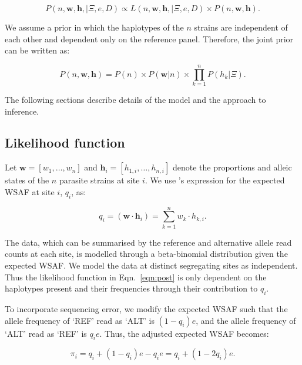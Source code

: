 \documentclass{nature}
\begin{document}
\begin{equation}
P(n, \mathbf{w}, \mathbf{h}, | \Xi, e, D) \propto L(n, \mathbf{w}, \mathbf{h}, | \Xi, e, D) \times P(n, \mathbf{w}, \mathbf{h}). \label{eqn:post}
\end{equation}

\noindent We assume a prior in which the haplotypes of the $n$ strains are independent of each other and dependent only on the reference panel.  Therefore, the joint prior can be written as:

\begin{equation}
P(n, \mathbf{w}, \mathbf{h}) = P(n) \times P(\mathbf{w} | n) \times \prod_{k=1}^{n} P(h_k | \Xi).
\end{equation}

\noindent The following sections describe details of the model and the approach to inference.


\subsection*{Likelihood function}

Let $\mathbf w = [w_1,\dots, w_n]$ and $\mathbf{h}_i = [h_{1,i},\dots,h_{n,i}]$ denote the proportions and alleic states of the $n$ parasite strains at site $i$. We use \cite{Jack2016}'s expression for the expected WSAF at site $i$, $q_{i}$, as:

\begin{equation}
q_i= (\mathbf{w}\cdot\mathbf{h}_{i})  =  \sum_{k=1}^{n} w_k \cdot h_{k,i} .\label{eqn:qij_full_sum}
\end{equation}

\noindent The data, which can be summarised by the reference and alternative allele read counts at each site, is modelled through a beta-binomial distribution given the expected WSAF.  We model the data at distinct segregating sites as independent.  Thus the likelihood function  in Eqn.~\eqref{eqn:post} is only dependent on the haplotypes present and their frequencies through their contribution to $q_{i}$.


To incorporate sequencing error, we modify the expected WSAF such that the allele frequency of `REF' read as `ALT' is $(1 - q_i)e$, and the allele frequency of `ALT' read as `REF' is $q_ie$. Thus, the adjusted expected WSAF becomes:

\begin{equation}
\pi_i = q_i + (1 - q_i)e - q_ie = q_i + (1 - 2q_i)e.\label{eqn:adj_q}
\end{equation}
\end{document}
